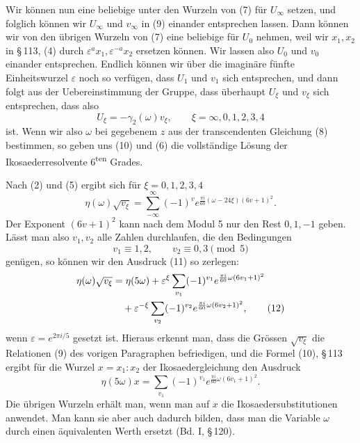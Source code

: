 \documentclass[11pt]{article}
\providecommand{\eps}{\varepsilon}
\providecommand{\eps}{\varepsilon}
\begin{document}
Wir können nun eine beliebige unter den Wurzeln von (7) für \(U_\infty\) setzen, und folglich können wir \(U_\infty\) und \(v_\infty\) in (9) einander entsprechen lassen. Dann können wir von den übrigen Wurzeln von (7) eine beliebige für \(U_0\) nehmen, weil wir \(x_1,x_2\) in \S\,113, (4) durch \(\eps^a x_1,\eps^{-a}x_2\) ersetzen können. Wir lassen also \(U_0\) und \(v_0\) einander entsprechen. Endlich können wir über die imaginäre fünfte Einheitswurzel \(\eps\) noch so verfügen, dass \(U_1\) und \(v_1\) sich entsprechen, und dann folgt aus der Uebereinstimmung der Gruppe, dass überhaupt \(U_\xi\) und \(v_\xi\) sich entsprechen, dass also
\begin{equation}
U_\xi=-\gamma_2(\omega)v_\xi,
\qquad
\xi=\infty,0,1,2,3,4
\tag{10}
\end{equation}
ist. Wenn wir also \(\omega\) bei gegebenem \(z\) aus der transcendenten Gleichung (8) bestimmen, so geben uns (10) und (6) die vollständige Lösung der Ikosaederresolvente 6\textsuperscript{ten} Grades.

Nach (2) und (5) ergibt sich für \(\xi=0,1,2,3,4\)
\begin{equation}
\eta(\omega)\sqrt{v_\xi}=\sum_{-\infty}^{\infty}(-1)^v e^{\frac{\pi i}{60}(\omega-24\xi)(6v+1)^2}.
\tag{11}
\end{equation}
Der Exponent \((6v+1)^2\) kann nach dem Modul 5 nur den Rest \(0,1,-1\) geben. Lässt man also \(v_1,v_2\) alle Zahlen durchlaufen, die den Bedingungen
\[
v_1\equiv1,2,
\qquad
v_2\equiv0,3\pmod 5
\]
genügen, so können wir den Ausdruck (11) so zerlegen:
\begin{align}
\eta(\omega)\sqrt{v_\xi}&=\eta(5\omega)+\eps^\xi\sum_{v_1}(-1)^{v_1}e^{\frac{\pi i}{60}\omega(6v_1+1)^2}\notag\\
&\quad+\eps^{-\xi}\sum_{v_2}(-1)^{v_2}e^{\frac{\pi i}{60}\omega(6v_2+1)^2},
\tag{12}
\end{align}
wenn \(\eps=e^{2\pi i/5}\) gesetzt ist. Hieraus erkennt man, dass die Grössen \(\sqrt{v_\xi}\) die Relationen (9) des vorigen Paragraphen befriedigen, und die Formel (10), \S\,113 ergibt für die Wurzel \(x=x_1:x_2\) der Ikosaedergleichung den Ausdruck
\begin{equation}
\eta(5\omega)x=\sum_{v_1}(-1)^{v_1}e^{\frac{\pi i}{60}\omega(6v_1+1)^2}.
\tag{13}
\end{equation}
Die übrigen Wurzeln erhält man, wenn man auf \(x\) die Ikosaedersubstitutionen anwendet. Man kann sie aber auch dadurch bilden, dass man die Variable \(\omega\) durch einen äquivalenten Werth ersetzt (Bd. I, \S\,120).
\end{document}
